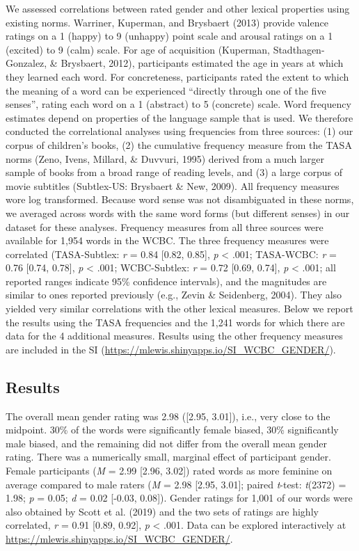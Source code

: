 \documentclass[english,,man,floatsintext]{apa6}
\begin{document}
We assessed correlations between rated gender and other lexical properties using existing norms. Warriner, Kuperman, and Brysbaert (2013) provide valence ratings on a 1 (happy) to 9 (unhappy) point scale and arousal ratings on a 1 (excited) to 9 (calm) scale. For age of acquisition (Kuperman, Stadthagen-Gonzalez, \& Brysbaert, 2012), participants estimated the age in years at which they learned each word. For concreteness, participants rated the extent to which the meaning of a word can be experienced \enquote{directly through one of the five senses}, rating each word on a 1 (abstract) to 5 (concrete) scale. Word frequency estimates depend on properties of the language sample that is used. We therefore conducted the correlational analyses using frequencies from three sources: (1) our corpus of children's books, (2) the cumulative frequency measure from the TASA norms (Zeno, Ivens, Millard, \& Duvvuri, 1995) derived from a much larger sample of books from a broad range of reading levels, and (3) a large corpus of movie subtitles (Subtlex-US: Brysbaert \& New, 2009). All frequency measures wore log transformed. Because word sense was not disambiguated in these norms, we averaged across words with the same word forms (but different senses) in our dataset for these analyses. Frequency measures from all three sources were available for 1,954 words in the WCBC. The three frequency measures were correlated (TASA-Subtlex: \emph{r} = 0.84 {[}0.82, 0.85{]}, \emph{p} \textless{} .001; TASA-WCBC: \emph{r} = 0.76 {[}0.74, 0.78{]}, \emph{p} \textless{} .001; WCBC-Subtlex: \emph{r} = 0.72 {[}0.69, 0.74{]}, \emph{p} \textless{} .001; all reported ranges indicate 95\% confidence intervals), and the magnitudes are similar to ones reported previously (e.g., Zevin \& Seidenberg, 2004). They also yielded very similar correlations with the other lexical measures. Below we report the results using the TASA frequencies and the 1,241 words for which there are data for the 4 additional measures. Results using the other frequency measures are included in the SI (\url{https://mlewis.shinyapps.io/SI_WCBC_GENDER/}).

\hypertarget{results}{%
\subsection{Results}\label{results}}

The overall mean gender rating was 2.98 ({[}2.95, 3.01{]}), i.e., very close to the midpoint. 30\% of the words were significantly female biased, 30\% significantly male biased, and the remaining did not differ from the overall mean gender rating. There was a numerically small, marginal effect of participant gender. Female participants (\emph{M} = 2.99 {[}2.96, 3.02{]}) rated words as more feminine on average compared to male raters (\emph{M} = 2.98 {[}2.95, 3.01{]}; paired \emph{t}-test: \emph{t}(2372) = 1.98; \emph{p} = 0.05; \emph{d} = 0.02 {[}-0.03, 0.08{]}). Gender ratings for 1,001 of our words were also obtained by Scott et al. (2019) and the two sets of ratings are highly correlated, \emph{r} = 0.91 {[}0.89, 0.92{]}, \emph{p} \textless{} .001. Data can be explored interactively at \url{https://mlewis.shinyapps.io/SI_WCBC_GENDER/}.
\end{document}
